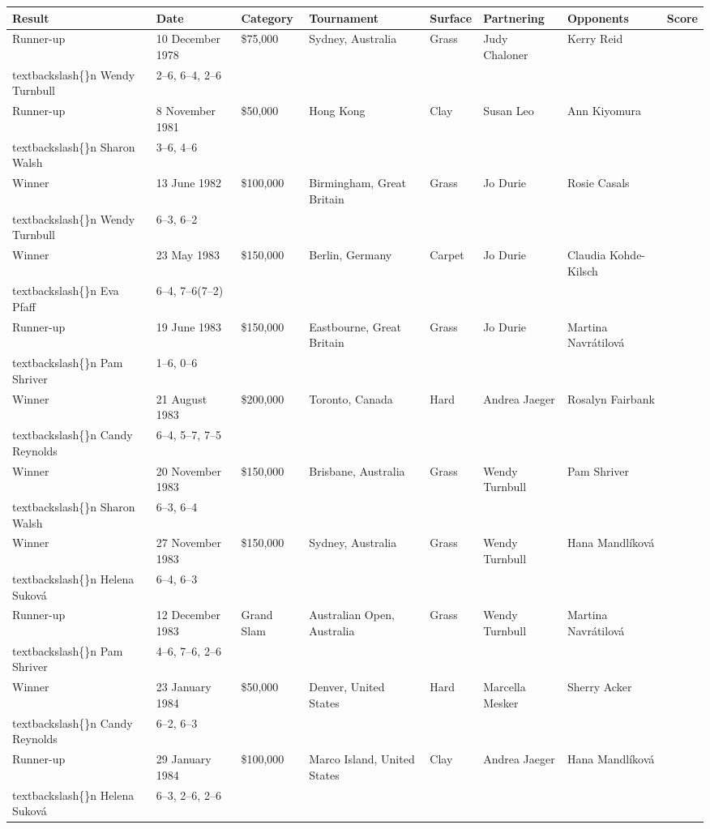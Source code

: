 \documentclass{article}
\begin{document}
\begin{tabular}{llllllll}
\toprule
Result & Date & Category & Tournament & Surface & Partnering & Opponents & Score \\
\midrule
Runner-up & 10 December 1978 & \$75,000 & Sydney, Australia & Grass & Judy Chaloner & Kerry Reid\\textbackslash\{\}n Wendy Turnbull & 2–6, 6–4, 2–6 \\
Runner-up & 8 November 1981 & \$50,000 & Hong Kong & Clay & Susan Leo & Ann Kiyomura\\textbackslash\{\}n Sharon Walsh & 3–6, 4–6 \\
Winner & 13 June 1982 & \$100,000 & Birmingham, Great Britain & Grass & Jo Durie & Rosie Casals\\textbackslash\{\}n Wendy Turnbull & 6–3, 6–2 \\
Winner & 23 May 1983 & \$150,000 & Berlin, Germany & Carpet & Jo Durie & Claudia Kohde-Kilsch\\textbackslash\{\}n Eva Pfaff & 6–4, 7–6(7–2) \\
Runner-up & 19 June 1983 & \$150,000 & Eastbourne, Great Britain & Grass & Jo Durie & Martina Navrátilová\\textbackslash\{\}n Pam Shriver & 1–6, 0–6 \\
Winner & 21 August 1983 & \$200,000 & Toronto, Canada & Hard & Andrea Jaeger & Rosalyn Fairbank\\textbackslash\{\}n Candy Reynolds & 6–4, 5–7, 7–5 \\
Winner & 20 November 1983 & \$150,000 & Brisbane, Australia & Grass & Wendy Turnbull & Pam Shriver\\textbackslash\{\}n Sharon Walsh & 6–3, 6–4 \\
Winner & 27 November 1983 & \$150,000 & Sydney, Australia & Grass & Wendy Turnbull & Hana Mandlíková\\textbackslash\{\}n Helena Suková & 6–4, 6–3 \\
Runner-up & 12 December 1983 & Grand Slam & Australian Open, Australia & Grass & Wendy Turnbull & Martina Navrátilová\\textbackslash\{\}n Pam Shriver & 4–6, 7–6, 2–6 \\
Winner & 23 January 1984 & \$50,000 & Denver, United States & Hard & Marcella Mesker & Sherry Acker\\textbackslash\{\}n Candy Reynolds & 6–2, 6–3 \\
Runner-up & 29 January 1984 & \$100,000 & Marco Island, United States & Clay & Andrea Jaeger & Hana Mandlíková\\textbackslash\{\}n Helena Suková & 6–3, 2–6, 2–6 \\

\end{tabular}
\end{document}
